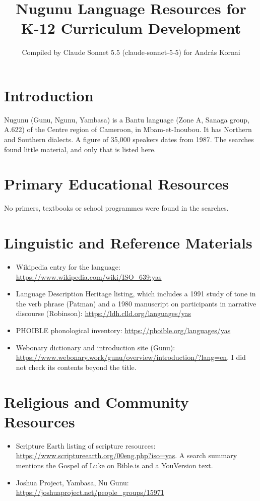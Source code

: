 \documentclass[12pt]{article}
\title{Nugunu Language Resources for K-12 Curriculum Development}
\author{Compiled by Claude Sonnet 5.5 (claude-sonnet-5-5) for Andr\'as Kornai}
\date{}
\begin{document}
\maketitle

\section{Introduction}
Nugunu (Gunu, Ngunu, Yambasa) is a Bantu language (Zone A, Sanaga group, A.622) of the Centre region of Cameroon, in Mbam-et-Inoubou. It has Northern and Southern dialects. A figure of 35,000 speakers dates from 1987. The searches found little material, and only that is listed here.

\section{Primary Educational Resources}
No primers, textbooks or school programmes were found in the searches.

\section{Linguistic and Reference Materials}
\begin{itemize}
\item Wikipedia entry for the language: \url{https://www.wikipedia.com/wiki/ISO_639:yas}
\item Language Description Heritage listing, which includes a 1991 study of tone in the verb phrase (Patman) and a 1980 manuscript on participants in narrative discourse (Robinson): \url{https://ldh.clld.org/languages/yas}
\item PHOIBLE phonological inventory: \url{https://phoible.org/languages/yas}
\item Webonary dictionary and introduction site (Gunu): \url{https://www.webonary.work/gunu/overview/introduction/?lang=en}. I did not check its contents beyond the title.
\end{itemize}

\section{Religious and Community Resources}
\begin{itemize}
\item Scripture Earth listing of scripture resources: \url{https://www.scriptureearth.org/00eng.php?iso=yas}. A search summary mentions the Gospel of Luke on Bible.is and a YouVersion text.
\item Joshua Project, Yambasa, Nu Gunu: \url{https://joshuaproject.net/people_groups/15971}
\end{itemize}
\end{document}
